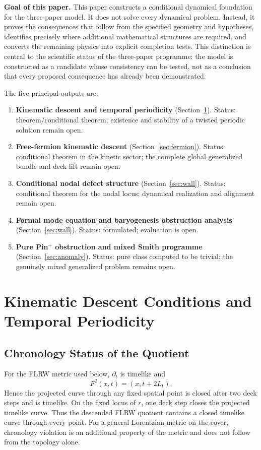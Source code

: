 \documentclass[11pt]{article}
\theoremstyle{canonmath}
\theoremstyle{canonpostulate}
\theoremstyle{canonclaim}
\begin{document}
\textbf{Goal of this paper.} This paper constructs a conditional dynamical foundation for the three-paper model. It does not solve every dynamical problem. Instead, it proves the consequences that follow from the specified geometry and hypotheses, identifies precisely where additional mathematical structures are required, and converts the remaining physics into explicit completion tests. This distinction is central to the scientific status of the three-paper programme: the model is constructed as a candidate whose consistency can be tested, not as a conclusion that every proposed consequence has already been demonstrated.

The five principal outputs are:

\begin{enumerate}
\item \textbf{Kinematic descent and temporal periodicity} (Section~\ref{sec:grav}). Status: theorem/conditional theorem; existence and stability of a twisted periodic solution remain open.
\item \textbf{Free-fermion kinematic descent} (Section~\ref{sec:fermion}). Status: conditional theorem in the kinetic sector; the complete global generalized bundle and deck lift remain open.
\item \textbf{Conditional nodal defect structure} (Section~\ref{sec:wall}). Status: conditional theorem for the nodal locus; dynamical realization and alignment remain open.
\item \textbf{Formal mode equation and baryogenesis obstruction analysis} (Section~\ref{sec:wall}). Status: formulated; evaluation is open.
\item \textbf{Pure Pin$^+$ obstruction and mixed Smith programme} (Section~\ref{sec:anomaly}). Status: pure class computed to be trivial; the genuinely mixed generalized problem remains open.
\end{enumerate}

\section{Kinematic Descent Conditions and Temporal Periodicity}
\label{sec:grav}

\subsection{Chronology Status of the Quotient}

For the FLRW metric used below, $\partial_t$ is timelike and
\begin{equation}
F^2(x,t)=(x,t+2L_t).
\end{equation}
Hence the projected curve through any fixed spatial point is closed after two deck steps and is timelike. On the fixed locus of $r$, one deck step closes the projected timelike curve. Thus the descended FLRW quotient contains a closed timelike curve through every point. For a general Lorentzian metric on the cover, chronology violation is an additional property of the metric and does not follow from the topology alone.
\end{document}
